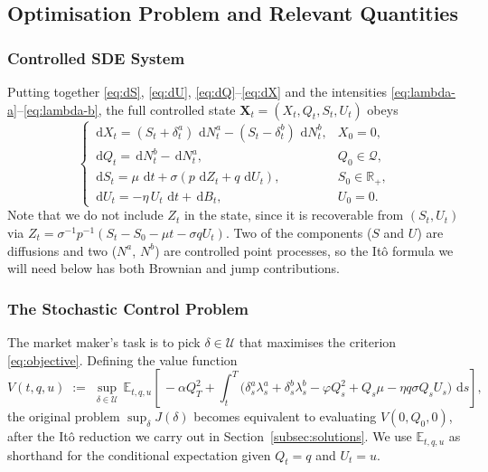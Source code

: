\documentclass[11pt,a4paper]{article}
\theoremstyle{plain}
\theoremstyle{definition}
\newcommand{\E}{\mathbb{E}}
\newcommand{\R}{\mathbb{R}}
\newcommand{\dd}{\,\mathrm{d}}
\begin{document}
\subsection{Optimisation Problem and Relevant Quantities}
\label{subsec:optim}

\subsubsection{Controlled SDE System}

Putting together \eqref{eq:dS}, \eqref{eq:dU}, \eqref{eq:dQ}--\eqref{eq:dX}
and the intensities \eqref{eq:lambda-a}--\eqref{eq:lambda-b}, the full
controlled state $\mathbf{X}_t = (X_t,Q_t,S_t,U_t)$ obeys
\begin{equation}
\label{eq:state-system}
  \begin{cases}
    \dd X_t = (S_t+\delta^a_t)\,\dd N^a_t - (S_t-\delta^b_t)\,\dd N^b_t,
        & X_0 = 0,\\[2pt]
    \dd Q_t = \dd N^b_t - \dd N^a_t,
        & Q_0 \in \mathcal{Q},\\[2pt]
    \dd S_t = \mu\,\dd t + \sigma(p\,\dd Z_t + q\,\dd U_t),
        & S_0 \in \R_+,\\[2pt]
    \dd U_t = -\eta\,U_t\,\dd t + \dd B_t,
        & U_0 = 0.
  \end{cases}
\end{equation}
Note that we do not include $Z_t$ in the state, since it is recoverable
from $(S_t,U_t)$ via $Z_t = \sigma^{-1}p^{-1}(S_t-S_0-\mu t-\sigma q U_t)$.
Two of the components ($S$ and $U$) are diffusions and two ($N^a$, $N^b$)
are controlled point processes, so the It\^o formula we will need below
has both Brownian and jump contributions.

\subsubsection{The Stochastic Control Problem}

The market maker's task is to pick $\delta\in\mathcal{U}$ that maximises
the criterion \eqref{eq:objective}. Defining the value function
\begin{equation}
\label{eq:value-fn}
  V(t,q,u) \;:=\; \sup_{\delta\in\mathcal{U}}\,
  \E_{t,q,u}\!\left[\,-\alpha Q_T^2
    + \!\int_t^T\!\!\bigl(\delta^a_s\lambda^a_s + \delta^b_s\lambda^b_s
      - \varphi Q_s^2 + Q_s\mu - \eta q\sigma Q_s U_s\bigr)\,\dd s\right],
\end{equation}
the original problem $\sup_\delta J(\delta)$ becomes equivalent to
evaluating $V(0,Q_0,0)$, after the It\^o reduction we carry out in
Section~\ref{subsec:solutions}. We use $\E_{t,q,u}$ as shorthand for the
conditional expectation given $Q_t=q$ and $U_t=u$.
\end{document}
